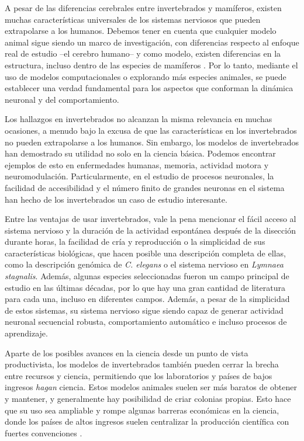 A pesar de las diferencias cerebrales entre invertebrados y mamíferos, existen muchas características universales de los sistemas nerviosos que pueden extrapolarse a los humanos. Debemos tener en cuenta que cualquier modelo animal sigue siendo un marco de investigación, con diferencias respecto al enfoque real de estudio --el cerebro humano-- y como modelo, existen diferencias en la estructura, incluso dentro de las especies de mamíferos \parencite{preuss_taking_2000}. Por lo tanto, mediante el uso de modelos computacionales o explorando más especies animales, se puede establecer una verdad fundamental para los aspectos que conforman la dinámica neuronal y del comportamiento.

Los hallazgos en invertebrados no alcanzan la misma relevancia en muchas ocasiones, a menudo bajo la excusa de que las características en los invertebrados no pueden extrapolarse a los humanos. Sin embargo, los modelos de invertebrados han demostrado su utilidad no solo en la ciencia básica. Podemos encontrar ejemplos de esto en enfermedades humanas, memoria, actividad motora y neuromodulación. Particularmente, en el estudio de procesos neuronales, la facilidad de accesibilidad y el número finito de grandes neuronas en el sistema han hecho de los invertebrados un caso de estudio interesante.

Entre las ventajas de usar invertebrados, vale la pena mencionar el fácil acceso al sistema nervioso y la duración de la actividad espontánea después de la disección durante horas, la facilidad de cría y reproducción o la simplicidad de sus características biológicas, que hacen posible una descripción completa de ellas, como la descripción genómica de \textit{C. elegans} o el sistema nervioso en \textit{Lymnaea stagnalis}. Además, algunas especies seleccionadas fueron un campo principal de estudio en las últimas décadas, por lo que hay una gran cantidad de literatura para cada una, incluso en diferentes campos. Además, a pesar de la simplicidad de estos sistemas, su sistema nervioso sigue siendo capaz de generar actividad neuronal secuencial robusta, comportamiento automático e incluso procesos de aprendizaje.

Aparte de los posibles avances en la ciencia desde un punto de vista productivista, los modelos de invertebrados también pueden cerrar la brecha entre recursos y ciencia, permitiendo que los laboratorios y países de bajos ingresos \textit{hagan} ciencia. Estos modelos animales suelen ser más baratos de obtener y mantener, y generalmente hay posibilidad de criar colonias propias. Esto hace que su uso sea ampliable y rompe algunas barreras económicas en la ciencia, donde los países de altos ingresos suelen centralizar la producción científica con fuertes convenciones \parencite{castillo_spineless_2017,stephan_how_2015}.


